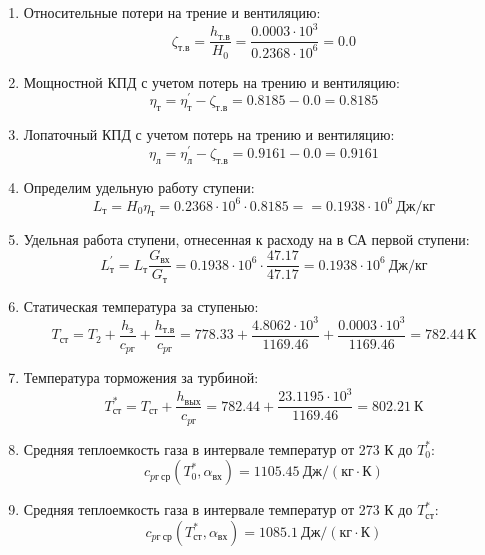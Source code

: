 \documentclass[a4paper,12pt]{article}
\begin{document}
\begin{enumerate}
        \item Относительные потери на трение и вентиляцию:
        \[
            \zeta_{т.в} = \frac{ h_{т.в} }{ H_0 } =
                \frac{ 0.0003 \cdot 10^3 }{ 0.2368 \cdot 10^6 } =
            0.0
        \]

        \item Мощностной КПД с учетом потерь на трению и вентиляцию:
        \[
            \eta_т = \eta_т^\prime - \zeta_{т.в} =
                0.8185 - 0.0 =
            0.8185
        \]

        \item Лопаточный КПД с учетом потерь на трению и вентиляцию:
        \[
            \eta_л = \eta_л^\prime - \zeta_{т.в} =
                0.9161 - 0.0 =
            0.9161
        \]

        \item Определим удельную работу ступени:
        \[
            L_т = H_0 \eta_т = 0.2368 \cdot 10^6 \cdot 0.8185 =
            = 0.1938 \cdot 10^6 \ Дж/кг
        \]

        \item Удельная работа ступени, отнесенная к расходу на в СА первой ступени:
        \[
            L_т^\prime = L_т \frac{ G_{вх} }{ G_т }  =
                0.1938 \cdot 10^6 \cdot
                \frac{ 47.17 }{ 47.17 } =
            0.1938 \cdot 10^6 \ Дж/кг
        \]

        \item Статическая температура за ступенью:
        \[
            T_{ст} = T_2 + \frac{ h_з }{ c_{pг} } + \frac{ h_{т.в} }{ c_{pг} } =
                778.33 +
                \frac{4.8062 \cdot 10^3 }{ 1169.46 } +
                \frac{ 0.0003 \cdot 10^3 }{ 1169.46 } =
            782.44 \ К
        \]

        \item Температура торможения за турбиной:
        \[
            T_{ст}^* = T_{ст} + \frac{ h_{вых} }{ c_{pг} } =
                782.44 +
                \frac{ 23.1195 \cdot 10^3 }{ 1169.46 } =
            802.21 \ К
        \]

        \item Средняя теплоемкость газа в интервале температур от 273 К до $T_0^*$:
        \[
            c_{pг\ ср} (T_0^*, \alpha_{вх}) =
            1105.45 \ Дж/(кг \cdot К)
        \]

        \item Средняя теплоемкость газа в интервале температур от 273 К до $T_{ст}^*$:
        \[
            c_{pг\ ср} (T_{ст}^*, \alpha_{вх}) =
            1085.1 \ Дж/(кг \cdot К)
        \]


\end{enumerate}
\end{document}
